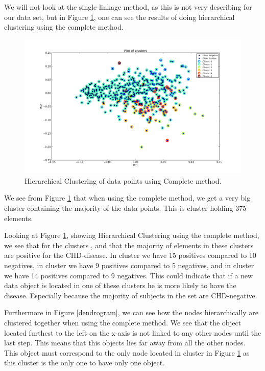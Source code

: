 We will not look at the single linkage method, as this is not very describing for our data set, but in Figure \ref{HCResultsCOM}, one can see the results of doing hierarchical clustering using the complete method.

\begin{figure}[H]
\includegraphics[scale=0.4]{pictures/HCCom.png}
\caption{\footnotesize Hierarchical Clustering of data points using Complete method.}
\label{HCResultsCOM}
\end{figure}

We see from Figure \ref{HCResultsCOM} that when using the complete method, we get a very big cluster containing the majority of the data points. This is cluster \HCCOMD{}  holding 375 elements.

Looking at Figure \ref{HCResultsCOM}, showing Hierarchical Clustering using the complete method, we see that for the clusters \HCCOMA{}, \HCCOMB{} and \HCCOMC{} that the majority of elements in these clusters are positive for the CHD-disease. In cluster \HCCOMA{} we have 15 positives compared to 10 negatives, in cluster \HCCOMB{} we have 9 positives compared to 5 negatives, and in cluster \HCCOMC{} we have 14 positives compared to 9 negatives. This could indicate that if a new data object is located in one of these clusters he is more likely to have the disease. Especially because the majority of subjects in the set are CHD-negative.

Furthermore in Figure \ref{dendrogram}, we can see how the nodes hierarchically are clustered together when using the complete method. We see that the object located furthest to the left on the x-axis is not linked to any other nodes until the last step. This means that this objects lies far away from all the other nodes. This object must correspond to the only node located in cluster \HCCOMS{} in Figure \ref{HCResultsCOM} as this cluster is the only one to have only one object.

